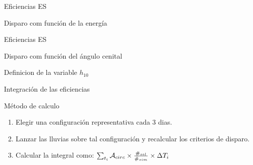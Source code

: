\begin{frame}{Eficiencias ES}
	\begin{block}{Disparo com funci\'on de la energ\'ia}
		\begin{center}
		\end{center}
	\end{block}
\end{frame}

\begin{frame}{Eficiencias ES}
\footnotesize
	\begin{block}{Disparo com funci\'on del \'angulo cenital}
		\begin{center}
		\hspace{1mm}
		\end{center}
	\end{block}
	\begin{block}{Definicion de la variable $h_{10}$}
		\begin{center}
		\end{center}
	\end{block}
\end{frame}

\begin{frame}{Integraci\'on de las eficiencias}
	\begin{block}{M\'etodo de calculo}
	\begin{enumerate}
	 \item Elegir una configuraci\'on representativa cada 3 dias.
	 \item Lanzar las lluvias sobre tal configuraci\'on y recalcular los criterios de disparo.
	 
	 \begin{center}  
	 \end{center}
	 \item Calcular la integral como: $\sum_{t_i} {\cal A}_{circ} \times \frac{\#_{sel}}{\#_{sim}} \times \Delta T_i$
	\end{enumerate}

	\end{block}
\end{frame}

